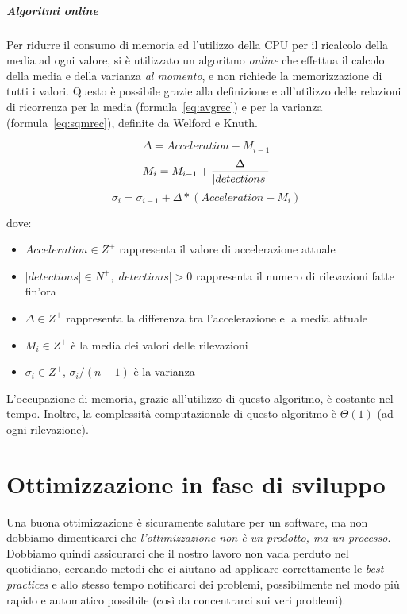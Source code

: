 \documentclass[a4paper,10pt]{memoir}
\begin{document}
\paragraph{Algoritmi \textit{online}} Per ridurre il consumo di memoria ed l'utilizzo della CPU per il ricalcolo della media ad ogni valore, si è utilizzato un algoritmo \textit{online}\cite{onlinealg} che effettua il calcolo della media e della varianza \textit{al momento}, e non richiede la memorizzazione di tutti i valori. Questo è possibile grazie alla definizione e all'utilizzo delle relazioni di ricorrenza per la media (formula~\ref{eq:avgrec}) e per la varianza (formula~\ref{eq:sqmrec}), definite da Welford e Knuth\cite{onlineavgknuth}.

\begin{equation}
\Delta = Acceleration - M_{i-1}
\end{equation}
\begin{equation}
\label{eq:avgrec}
M_i = M_{i-1} + {\Delta \over |detections|}
\end{equation}
\begin{equation}
\label{eq:sqmrec}
\sigma_i = \sigma_{i-1} + \Delta * (Acceleration - M_i)
\end{equation}

dove: \begin{itemize}
\item $Acceleration \in Z^+$ rappresenta il valore di accelerazione attuale
\item $|detections| \in N^+, |detections| > 0$ rappresenta il numero di rilevazioni fatte fin'ora
\item $\Delta \in Z^+$ rappresenta la differenza tra l'accelerazione e la media attuale
\item $M_i \in Z^+$ è la media dei valori delle rilevazioni
\item $\sigma_i \in Z^+$, $\sigma_i / (n - 1)$ è la varianza
\end{itemize}

L'occupazione di memoria, grazie all'utilizzo di questo algoritmo, è costante nel tempo. Inoltre, la complessità computazionale di questo algoritmo è $\Theta(1)$ (ad ogni rilevazione).

\chapter{Ottimizzazione in fase di sviluppo}

Una buona ottimizzazione è sicuramente salutare per un software, ma non dobbiamo dimenticarci che \textit{l'ottimizzazione non è un prodotto, ma un processo}. Dobbiamo quindi assicurarci che il nostro lavoro non vada perduto nel quotidiano, cercando metodi che ci aiutano ad applicare correttamente le \textit{best practices} e allo stesso tempo notificarci dei problemi, possibilmente nel modo più rapido e automatico possibile (così da concentrarci sui veri problemi).
\end{document}
